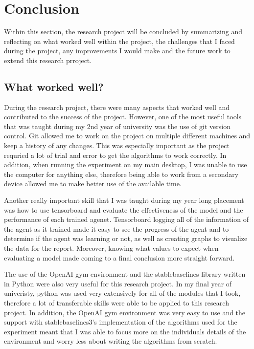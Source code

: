 \section{Conclusion}

Within this section, the research project will be concluded by summarizing and reflecting on what worked well within the project, the challenges that I faced during the project, any improvements I would make and the future work to extend this research prroject.

\subsection{What worked well?}

During the research project, there were many aspects that worked well and contributed to the success of the project. However, one of the most useful tools that was taught during my 2nd year of university was the use of git version control. Git allowed me to work on the project on multiple different machines and keep a history of any changes. This was especially important as the project requried a lot of trial and error to get the algorithms to work correctly. In addition, when running the experiment on my main desktop, I was unable to use the computer for anything else, therefore being able to work from a secondary device allowed me to make better use of the available time.  

Another really important skill that I was taught during my year long placement was how to use tensorboard and evaluate the effectiveness of the model and the performance of each trained agenet. Tensorboard logging all of the information of the agent as it trained made it easy to see the progress of the agent and to determine if the agent was learning or not, as well as creating graphs to visualize the data for the report. Moreover, knowing what values to expect when evaluating a model made coming to a final conclusion more straight forward.  

The use of the OpenAI gym environment and the stablebaselines library written in Python were also very useful for this research project. In my final year of univeristy, python was used very extensively for all of the modules that I took, therefore a lot of transferable skills were able to be applied to this research project. In addition, the OpenAI gym environment was very easy to use and the support with stablebaselines3's implementation of the algorithms used for the experiment meant that I was able to focus more on the individuals details of the environment and worry less about writing the algorithms from scratch. 

